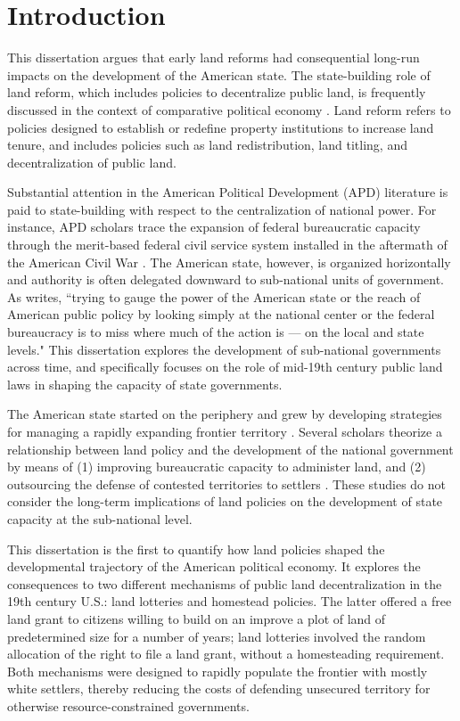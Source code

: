 \chapter{Introduction} \label{diss-intro}

This dissertation argues that early land reforms had consequential long-run impacts on the development of the American state. The state-building role of land reform, which includes policies to decentralize public land, is frequently discussed in the context of comparative political economy \citep[e.g.,][]{albertus2015autocracy, murtazashvili2016does}. Land reform refers to policies designed to establish or redefine property institutions to increase land tenure, and includes policies such as land redistribution, land titling, and decentralization of public land. 

Substantial attention in the American Political Development (APD) literature is paid to state-building with respect to the centralization of national power. For instance, APD scholars trace the expansion of federal bureaucratic capacity through the merit-based federal civil service system installed in the aftermath of the American Civil War \citep{skowronek1982building,bensel1990,carpenter2001}. The American state, however, is organized horizontally and authority is often delegated downward to sub-national units of government. As \citet{novak2008myth} writes, ``trying to gauge the power of the American state or the reach of American public policy by looking simply at the national center or the federal bureaucracy is to miss where much of the action is --- on the local and state levels." This dissertation explores the development of sub-national governments across time, and specifically focuses on the role of mid-19th century public land laws in shaping the capacity of state governments.

The American state started on the periphery and grew by developing strategies for managing a rapidly expanding frontier territory \citep{greene1986peripheries}. Several scholars theorize a relationship between land policy and the development of the national government by means of (1) improving bureaucratic capacity to administer land, and (2) outsourcing the defense of contested territories to settlers \citep{frymer2014rush,frymer2017building}. These studies do not consider the long-term implications of land policies on the development of state capacity at the sub-national level.

This dissertation is the first to quantify how land policies shaped the developmental trajectory of the American political economy. It explores the consequences to two different mechanisms of public land decentralization in the 19th century U.S.: land lotteries and homestead policies. The latter offered a free land grant to citizens willing to build on an improve a plot of land of predetermined size for a number of years; land lotteries involved the random allocation of the right to file a land grant, without a homesteading requirement. Both mechanisms were designed to rapidly populate the frontier with mostly white settlers, thereby reducing the costs of defending unsecured territory for otherwise resource-constrained governments.

